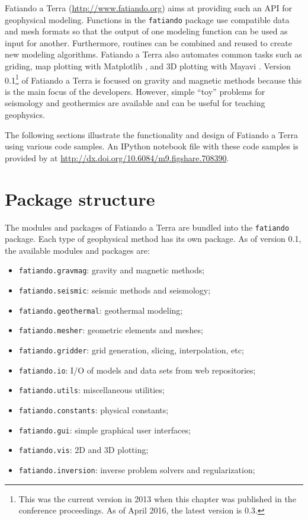 Fatiando a Terra (\url{http://www.fatiando.org}) aims at providing such an API
for geophysical modeling. Functions in the \texttt{fatiando} package use
compatible data and mesh formats so that the output of one modeling function
can be used as input for another. Furthermore, routines can be combined and
reused to create new modeling algorithms.  Fatiando a Terra also automates
common tasks such as griding, map plotting with Matplotlib \citep[][
\url{http://matplotlib.org}]{hunter2007}, and 3D plotting with Mayavi \citep[][
\url{http://code.enthought.com/projects/mayavi}]{ramachandran2011}.  Version
0.1\footnote{
    This was the current version in 2013 when this chapter was published in the
    conference proceedings. As of April 2016, the latest version is 0.3.}
of Fatiando a Terra is focused on gravity and magnetic methods because this is
the main focus of the developers.  However, simple ``toy'' problems for
seismology and geothermics are available and can be useful for teaching
geophysics.

The following sections illustrate the functionality and design of Fatiando a
Terra using various code samples. An IPython \citep[][
\url{http://ipython.org/}]{perez2007} notebook file with these code samples is
provided by \citet{uieda2013} at
\url{http://dx.doi.org/10.6084/m9.figshare.708390}.



\section{Package structure}

The modules and packages of Fatiando a Terra are bundled into the
\texttt{fatiando} package. Each type of geophysical method has its own
package. As of version 0.1, the available modules and packages are:

\begin{itemize}
\item
  \texttt{fatiando.gravmag}: gravity and magnetic methods;
\item
  \texttt{fatiando.seismic}: seismic methods and seismology;
\item
  \texttt{fatiando.geothermal}: geothermal modeling;
\item
  \texttt{fatiando.mesher}: geometric elements and meshes;
\item
  \texttt{fatiando.gridder}: grid generation, slicing, interpolation,
  etc;
\item
  \texttt{fatiando.io}: I/O of models and data sets from web
  repositories;
\item
  \texttt{fatiando.utils}: miscellaneous utilities;
\item
  \texttt{fatiando.constants}: physical constants;
\item
  \texttt{fatiando.gui}: simple graphical user interfaces;
\item
  \texttt{fatiando.vis}: 2D and 3D plotting;
\item
  \texttt{fatiando.inversion}: inverse problem solvers and
  regularization;
\end{itemize}

